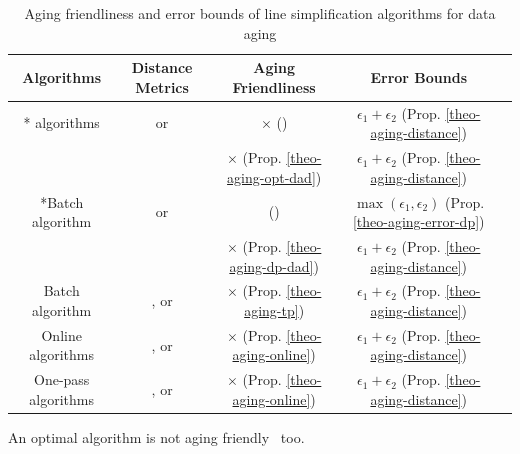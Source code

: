 \begin{table}
	\renewcommand{\arraystretch}{1.20}
	\vspace{-1ex}
	\caption{\small Aging friendliness and error bounds of line simplification algorithms for data aging}
	\label{tab:summary-data-aging}
	\centering
	\scriptsize
	\begin{tabular}{|c|c|c|c|c|}
		\hline
		{\bf{Algorithms}} &\bf{Distance Metrics} & \bf{Aging Friendliness} & {\bf{Error Bounds}}  \\		
		\hline

		{\multirow{2}*{{\opt} algorithms}} &\ped or \sed	& \hspace{2ex} $\times$ (\cite{Cao:Spatio}) & $\epsilon_1 + \epsilon_2$  (Prop. \ref{theo-aging-distance})	\\
		\cline{2-4}
		&\dad	& $\times$  (Prop. \ref{theo-aging-opt-dad})	& $\epsilon_1 + \epsilon_2$  (Prop. \ref{theo-aging-distance})\\
		\hline
		
		{\multirow{2}*{Batch algorithm \dpa}} &\ped or \sed	&\checkmark (\cite{Cao:Spatio}) & $\max(\epsilon_1, \epsilon_2)$   (Prop. \ref{theo-aging-error-dp})\\
		\cline{2-4}
		&\dad	& $\times$  (Prop. \ref{theo-aging-dp-dad}) & $\epsilon_1 + \epsilon_2$   (Prop. \ref{theo-aging-distance})\\
		\hline
		
		{Batch algorithm \tpa}	& \ped, \sed or \dad & $\times$  (Prop. \ref{theo-aging-tp}) & $\epsilon_1 + \epsilon_2$  (Prop. \ref{theo-aging-distance})  \\
		\hline
		
		{Online algorithms}	& \ped, \sed or \dad & $\times$  (Prop. \ref{theo-aging-online})& $\epsilon_1 + \epsilon_2$  (Prop. \ref{theo-aging-distance})  \\
		\hline

		{One-pass algorithms}	& \ped, \sed or \dad & $\times$ (Prop. \ref{theo-aging-online})& $\epsilon_1 + \epsilon_2$  (Prop. \ref{theo-aging-distance})  \\

		\hline
	\end{tabular}
	\vspace{-2ex}
\end{table}




\begin{proposition}
	\label{theo-aging-opt-dad}
	An optimal algorithm is not aging friendly \wrt~\dad too.
\end{proposition}

